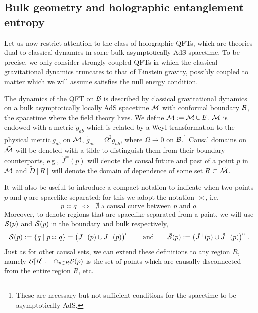 \documentclass[12pt]{article}
\def\bulkD{{\tilde D}}
\def\bulkJ{{\tilde J}}
\def\splrel{\asymp}
\def\splsep{{\cal S}}
\def\bulksplsep{{\tilde {\cal S}}}
\def\bulk{{\cal M}}
\def\bdy{{\cal B}}
\def\overM{\tilde \bulk}
\begin{document}
\subsection{Bulk geometry and holographic entanglement entropy}
\label{sec:cbulkexp}

Let us now restrict attention to the class of holographic QFTs, which are theories dual to classical dynamics in some bulk asymptotically AdS spacetime. To be precise, we only consider strongly coupled QFTs in which the classical gravitational dynamics truncates to that of Einstein gravity, possibly coupled to matter which we will assume satisfies the null energy condition. 

The dynamics of the QFT on $\bdy$ is described by classical gravitational dynamics on a bulk 
asymptotically locally AdS spacetime $\bulk$ with conformal boundary $\bdy$, the spacetime where the field theory lives. We define $\overM:=\bulk\cup\bdy$. $\overM$ is endowed with a metric $\tilde g_{ab}$ which is related by a Weyl transformation to the physical metric $g_{ab}$ on $\bulk$, $\tilde g_{ab}=\Omega^2g_{ab}$, where $\Omega\to0$ on $\bdy$.\footnote{ These are necessary but not sufficient conditions for the spacetime to be asymptotically AdS.}   Causal domains on $\overM$ will be denoted with a tilde to distinguish them from their boundary counterparts, e.g., $\bulkJ^\pm(p)$ will denote the causal future and past of a point $p$ in $\overM$ and $\bulkD[R]$ will denote the domain of dependence of some set $R\subset\overM$.


It will also be useful to introduce a compact notation to indicate when  two points $p$ and $q$ are spacelike-separated; for this we adopt the notation $\splrel$, i.e.\
%
\begin{equation}
p\splrel q \;\; \Leftrightarrow \;\;\text{$\nexists$ a causal curve between $p$ and $q$.}
\label{splrel}
\end{equation}	
%
Moreover, to denote regions that are spacelike separated from a point, we will use $\splsep(p)$ and $\bulksplsep(p)$  in the boundary and bulk respectively,
%
\begin{equation}
\splsep(p)  := \{ q \mid p\splrel q  \}
=\left( J^+(p) \cup J^-(p) \right)^c
\qquad {\rm and} \qquad
\bulksplsep(p)  := \left( \bulkJ^+(p) \cup \bulkJ^-(p) \right)^c\,.
\label{splregions}
\end{equation}	
%
Just as for other causal sets, we can extend these definitions to any region $R$, namely $\splsep[R] := \cap_{p \in R} \splsep(p)$ is the set of points which are causally disconnected from the entire region $R$, etc.
\end{document}
